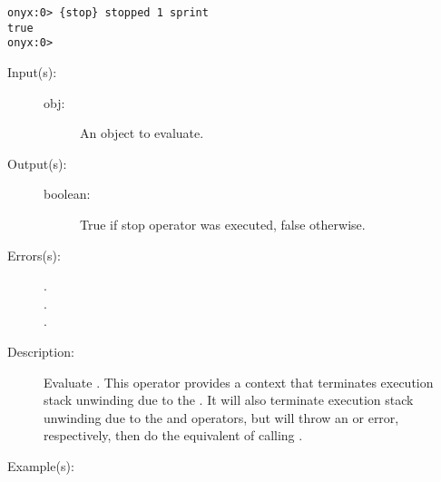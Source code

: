 \begin{description}
\begin{description}
\begin{verbatim}
onyx:0> {stop} stopped 1 sprint
true
onyx:0>
		\end{verbatim}
	\end{description}
\label{systemdict:stopped}
\item[{\onyxop{obj}{stopped}{boolean}}: ]
	\begin{description}\item[]
	\item[Input(s): ]
		\begin{description}\item[]
		\item[obj: ]
			An object to evaluate.
		\end{description}
	\item[Output(s): ]
		\begin{description}\item[]
		\item[boolean: ]
			True if stop operator was executed, false otherwise.
		\end{description}
	\item[Errors(s): ]
		\begin{description}\item[]
		\item[.]
		\item[.]
		\item[.]
		\end{description}
	\item[Description: ]
		Evaluate .  This operator provides a context that
		terminates execution stack unwinding due to the
		.  It will also
		terminate execution stack unwinding due to the
		 and
		 operators, but will
		throw an  or
		 error, respectively, then do
		the equivalent of calling
		.
	\item[Example(s): ]\begin{verbatim}


\end{verbatim}
\end{description}
\end{description}
